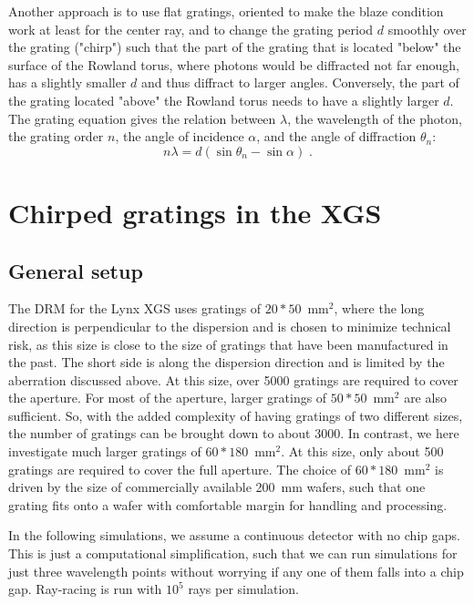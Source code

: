 \documentclass[]{spie}  %
\begin{document}
Another approach is to use flat gratings, oriented to make the blaze condition work at least for the center ray, and to change the grating period $d$ smoothly over the grating ("chirp") such that the part of the grating that is located "below" the surface of the Rowland torus, where photons would be diffracted not far enough, has a slightly smaller $d$ and thus diffract to larger angles. Conversely, the part of the grating located "above" the Rowland torus needs to have a slightly larger $d$. The grating equation gives the relation between $\lambda$, the wavelength of the photon, the grating order $n$, the angle of incidence $\alpha$, and the angle of diffraction $\theta_n$:
$$
n\lambda = d (\sin \theta_n - \sin \alpha ) \; .
$$

\section{Chirped gratings in the XGS}
\label{sect:chirp}
\subsection{General setup}
The DRM for the Lynx XGS uses gratings of $20 * 50$~mm$^2$, where the long direction is perpendicular to the dispersion and is chosen to minimize technical risk, as this size is close to the size of gratings that have been manufactured in the past. The short side is along the dispersion direction and is limited by the aberration discussed above. At this size, over 5000 gratings are required to cover the aperture. For most of the aperture, larger gratings of $50*50$~mm$^2$ are also sufficient\cite{CATXGS}. So, with the added complexity of having gratings of two different sizes, the number of gratings can be brought down to about 3000. In contrast, we here investigate much larger gratings of $60 * 180$~mm$^2$. At this size, only about 500 gratings are required to cover the full aperture. The choice of $60 * 180$~mm$^2$ is driven by the size of commercially available 200~mm wafers, such that one grating fits onto a wafer with comfortable margin for handling and processing.

In the following simulations, we assume a continuous detector with no chip gaps. This is just a computational simplification, such that we can run simulations for just three wavelength points without worrying if any one of them falls into a chip gap.
Ray-racing is run with $10^5$ rays per simulation.
\end{document}
